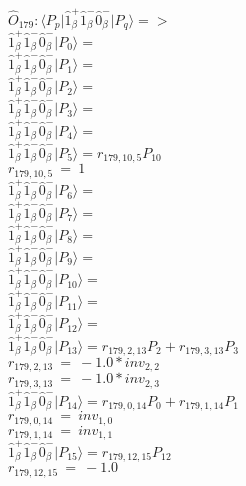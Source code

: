 \documentclass[14pt]{article}
\begin{document}
    $\hat{O}_{179}:  \langle{P_p}\vert \hat{1}_{\beta}^{+}\hat{1}_{\beta}^{-}\hat{0}_{\beta}^{-} \vert{P_q}\rangle => $ \\ 
    $ \hat{1}_{\beta}^{+}\hat{1}_{\beta}^{-}\hat{0}_{\beta}^{-} \vert{P_{0}}\rangle =  $ \\ 
    $ \hat{1}_{\beta}^{+}\hat{1}_{\beta}^{-}\hat{0}_{\beta}^{-} \vert{P_{1}}\rangle =  $ \\ 
    $ \hat{1}_{\beta}^{+}\hat{1}_{\beta}^{-}\hat{0}_{\beta}^{-} \vert{P_{2}}\rangle =  $ \\ 
    $ \hat{1}_{\beta}^{+}\hat{1}_{\beta}^{-}\hat{0}_{\beta}^{-} \vert{P_{3}}\rangle =  $ \\ 
    $ \hat{1}_{\beta}^{+}\hat{1}_{\beta}^{-}\hat{0}_{\beta}^{-} \vert{P_{4}}\rangle =  $ \\ 
    $ \hat{1}_{\beta}^{+}\hat{1}_{\beta}^{-}\hat{0}_{\beta}^{-} \vert{P_{5}}\rangle = {r}_{179,10,5}P_{10} $ \\ 
    ${r}_{179,10,5}\ =\ 1 $ \\ 
    $ \hat{1}_{\beta}^{+}\hat{1}_{\beta}^{-}\hat{0}_{\beta}^{-} \vert{P_{6}}\rangle =  $ \\ 
    $ \hat{1}_{\beta}^{+}\hat{1}_{\beta}^{-}\hat{0}_{\beta}^{-} \vert{P_{7}}\rangle =  $ \\ 
    $ \hat{1}_{\beta}^{+}\hat{1}_{\beta}^{-}\hat{0}_{\beta}^{-} \vert{P_{8}}\rangle =  $ \\ 
    $ \hat{1}_{\beta}^{+}\hat{1}_{\beta}^{-}\hat{0}_{\beta}^{-} \vert{P_{9}}\rangle =  $ \\ 
    $ \hat{1}_{\beta}^{+}\hat{1}_{\beta}^{-}\hat{0}_{\beta}^{-} \vert{P_{10}}\rangle =  $ \\ 
    $ \hat{1}_{\beta}^{+}\hat{1}_{\beta}^{-}\hat{0}_{\beta}^{-} \vert{P_{11}}\rangle =  $ \\ 
    $ \hat{1}_{\beta}^{+}\hat{1}_{\beta}^{-}\hat{0}_{\beta}^{-} \vert{P_{12}}\rangle =  $ \\ 
    $ \hat{1}_{\beta}^{+}\hat{1}_{\beta}^{-}\hat{0}_{\beta}^{-} \vert{P_{13}}\rangle = {r}_{179,2,13}P_{2}+{r}_{179,3,13}P_{3} $ \\ 
    ${r}_{179,2,13}\ =\ -1.0*{inv}_{2,2} $ \\ 
    ${r}_{179,3,13}\ =\ -1.0*{inv}_{2,3} $ \\ 
    $ \hat{1}_{\beta}^{+}\hat{1}_{\beta}^{-}\hat{0}_{\beta}^{-} \vert{P_{14}}\rangle = {r}_{179,0,14}P_{0}+{r}_{179,1,14}P_{1} $ \\ 
    ${r}_{179,0,14}\ =\ {inv}_{1,0} $ \\ 
    ${r}_{179,1,14}\ =\ {inv}_{1,1} $ \\ 
    $ \hat{1}_{\beta}^{+}\hat{1}_{\beta}^{-}\hat{0}_{\beta}^{-} \vert{P_{15}}\rangle = {r}_{179,12,15}P_{12} $ \\ 
    ${r}_{179,12,15}\ =\ -1.0 $ \\ 
    
\end{document}
